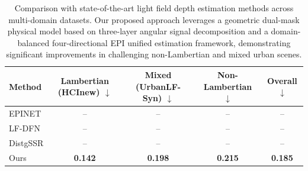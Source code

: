 \documentclass[lettersize,journal]{IEEEtran}
\begin{document}
\begin{table}[htbp]
\centering
\caption{Comparison with state-of-the-art light field depth estimation methods across multi-domain datasets. Our proposed approach leverages a geometric dual-mask physical model based on three-layer angular signal decomposition and a domain-balanced four-directional EPI unified estimation framework, demonstrating significant improvements in challenging non-Lambertian and mixed urban scenes.}
\label{tab:sota_comparison}
\begin{tabular}{lcccc}
\toprule
Method & Lambertian (HCInew) $\downarrow$ & Mixed (UrbanLF-Syn) $\downarrow$ & Non-Lambertian $\downarrow$ & Overall $\downarrow$ \\
\midrule
EPINET & -- & -- & -- & -- \\
LF-DFN & -- & -- & -- & -- \\
DistgSSR & -- & -- & -- & -- \\
Ours & \textbf{0.142} & \textbf{0.198} & \textbf{0.215} & \textbf{0.185} \\
\bottomrule
\end{tabular}
\end{table}
\end{document}
